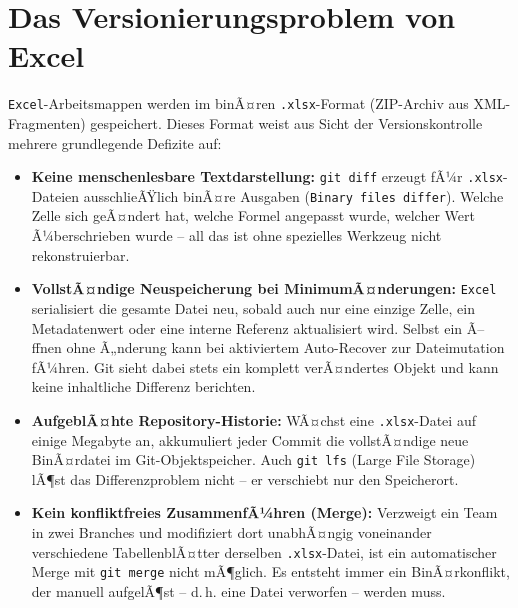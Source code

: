 ﻿\documentclass[12pt,a4paper]{report}
\theoremstyle{definition}
\theoremstyle{remark}
\newcommand{\excel}{\texttt{Excel}}
\newcommand{\code}[1]{\texttt{#1}}
\begin{document}
\section{Das Versionierungsproblem von Excel}

\excel-Arbeitsmappen werden im binÃ¤ren \code{.xlsx}-Format (ZIP-Archiv aus
XML-Fragmenten) gespeichert. Dieses Format weist aus Sicht der
Versionskontrolle mehrere grundlegende Defizite auf:

\begin{itemize}[leftmargin=1.5em, itemsep=3pt]
  \item \textbf{Keine menschenlesbare Textdarstellung:}
        \code{git diff} erzeugt fÃ¼r \code{.xlsx}-Dateien ausschlieÃŸlich
        binÃ¤re Ausgaben (\code{Binary files differ}).
        Welche Zelle sich geÃ¤ndert hat, welche Formel angepasst wurde,
        welcher Wert Ã¼berschrieben wurde -- all das ist ohne spezielles
        Werkzeug nicht rekonstruierbar.

  \item \textbf{VollstÃ¤ndige Neuspeicherung bei MinimumÃ¤nderungen:}
        \excel{} serialisiert die gesamte Datei neu, sobald auch nur eine
        einzige Zelle, ein Metadatenwert oder eine interne Referenz
        aktualisiert wird. Selbst ein Ã–ffnen ohne Ã„nderung kann bei
        aktiviertem Auto-Recover zur Dateimutation fÃ¼hren. Git sieht
        dabei stets ein komplett verÃ¤ndertes Objekt und kann keine
        inhaltliche Differenz berichten.

  \item \textbf{AufgeblÃ¤hte Repository-Historie:}
        WÃ¤chst eine \code{.xlsx}-Datei auf einige Megabyte an, akkumuliert
        jeder Commit die vollstÃ¤ndige neue BinÃ¤rdatei im
        Git-Objektspeicher. Auch \code{git lfs} (Large File Storage)
        lÃ¶st das Differenzproblem nicht -- er verschiebt nur den
        Speicherort.

  \item \textbf{Kein konfliktfreies ZusammenfÃ¼hren (Merge):}
        Verzweigt ein Team in zwei Branches und modifiziert dort
        unabhÃ¤ngig voneinander verschiedene TabellenblÃ¤tter derselben
        \code{.xlsx}-Datei, ist ein automatischer Merge mit
        \code{git merge} nicht mÃ¶glich. Es entsteht immer ein
        BinÃ¤rkonflikt, der manuell aufgelÃ¶st -- d.\,h. eine Datei
        verworfen -- werden muss.


\end{itemize}
\end{document}
